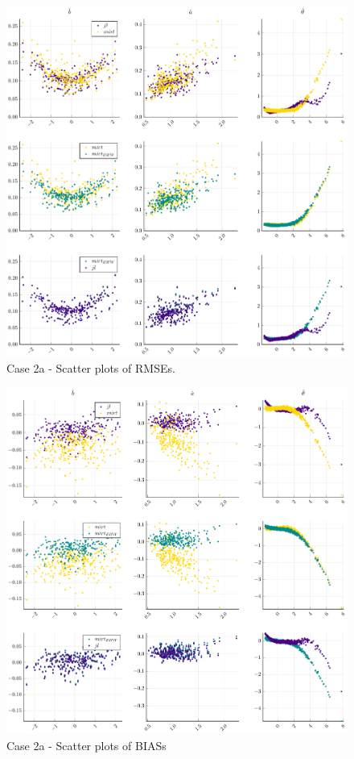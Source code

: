 \begin{figure}[ht]
	\centering
	\includegraphics[width=\textwidth]{Figures/2a/RMSEscatter.pdf}
	\caption{Case 2a - Scatter plots of RMSEs.}
	\label{fig:spRMSE2a}
\end{figure}
\begin{figure}[ht]
	\centering
	\includegraphics[width=\textwidth]{Figures/2a/BIASscatter.pdf}
	\caption{Case 2a - Scatter plots of BIASs }
	\label{fig:spBIAS2a}
\end{figure}
